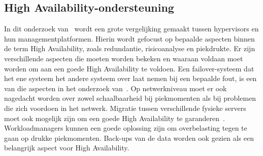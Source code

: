 \subsection{High Availability-ondersteuning}
In dit onderzoek van~\autocite{dudnik2017creating} wordt een grote vergelijking gemaakt tussen hypervisors en hun managementplatformen. Hierin wordt gefocust op bepaalde aspecten binnen de term High Availability, zoals redundantie, risicoanalyse en piekdrukte.
Er zijn verschillende aspecten die moeten worden bekeken en waaraan voldaan moet worden om aan een goede High Availability te voldoen. Een failover-systeem dat het ene systeem het andere systeem over laat nemen bij een bepaalde fout, is een van die aspecten in het onderzoek van~\autocite{dudnik2017creating}.
Op netwerkniveau moet er ook nagedacht worden over zowel schaalbaarheid bij piekmomenten als bij problemen die zich voordoen in het netwerk. Migratie tussen verschillende fysieke servers moet ook mogelijk zijn om een goede High Availability te garanderen~\autocite{dudnik2017creating}.
Workloadmanagers kunnen een goede oplossing zijn om overbelasting tegen te gaan op drukke piekmomenten. Back-ups van de data worden ook gezien als een belangrijk aspect voor High Availability.

